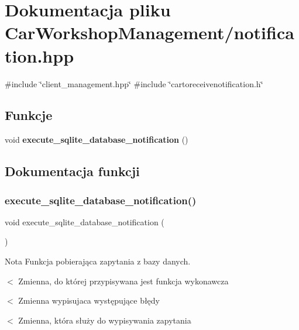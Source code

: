 \section{Dokumentacja pliku Car\+Workshop\+Management/notification.hpp}
\label{notification_8hpp}
{\ttfamily \#include \char`\"{}client\+\_\+management.\+hpp\char`\"{}}\newline
{\ttfamily \#include \char`\"{}cartoreceivenotification.\+h\char`\"{}}\newline
\subsection*{Funkcje}
\begin{DoxyCompactItemize}
\item 
void \textbf{ execute\+\_\+sqlite\+\_\+database\+\_\+notification} ()
\end{DoxyCompactItemize}


\subsection{Dokumentacja funkcji}
\mbox{\label{notification_8hpp_a09e3960c157372c6214c2c45ab1d8e0e}} 
\subsubsection{execute\_sqlite\_database\_notification()}
{\footnotesize\ttfamily void execute\+\_\+sqlite\+\_\+database\+\_\+notification (\begin{DoxyParamCaption}{ }\end{DoxyParamCaption})}


\begin{DoxyCode}{0}
\end{DoxyCode}
 \begin{DoxyNote}{Nota}
Funkcja pobierająca zapytania z bazy danych. 
\end{DoxyNote}
$<$ Zmienna, do której przypisywana jest funkcja wykonawcza

$<$ Zmienna wypisujaca występujące błędy

$<$ Zmienna, która służy do wypisywania zapytania 